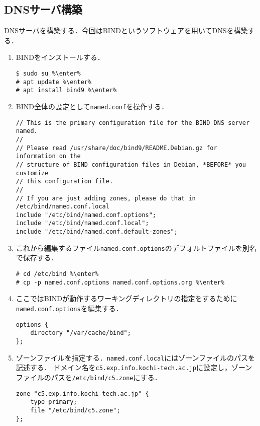 \subsection{DNSサーバ構築}
DNSサーバを構築する．今回はBINDというソフトウェアを用いてDNSを構築する．
\newcommand{\enter}{\ovalbox{Enter⏎}}
\begin{enumerate}
    \item BINDをインストールする．
          \begin{lstlisting}
$ sudo su %\enter%
# apt update %\enter%
# apt install bind9 %\enter%
    \end{lstlisting}
    \item BIND全体の設定として\texttt{named.conf}を操作する．
          \begin{lstlisting}[caption={\ttfamily /etc/bind/named.conf},style=file]
// This is the primary configuration file for the BIND DNS server named.
//
// Please read /usr/share/doc/bind9/README.Debian.gz for information on the
// structure of BIND configuration files in Debian, *BEFORE* you customize
// this configuration file.
//
// If you are just adding zones, please do that in /etc/bind/named.conf.local
include "/etc/bind/named.conf.options";
include "/etc/bind/named.conf.local";
include "/etc/bind/named.conf.default-zones";
\end{lstlisting}
    \item これから編集するファイル\texttt{named.conf.options}のデフォルトファイルを別名で保存する．
          \begin{lstlisting}
# cd /etc/bind %\enter%
# cp -p named.conf.options named.conf.options.org %\enter%
\end{lstlisting}
    \item ここではBINDが動作するワーキングディレクトリの指定をするために\texttt{named.conf.options}を編集する．
          \begin{lstlisting}[caption={\ttfamily /etc/bind/named.conf.options},style=file]
options {
    directory "/var/cache/bind";
};
\end{lstlisting}
    \item ゾーンファイルを指定する．\texttt{named.conf.local}にはゾーンファイルのパスを記述する．
          ドメイン名を\texttt{c5.exp.info.kochi-tech.ac.jp}に設定し，ゾーンファイルのパスを\texttt{/etc/bind/c5.zone}にする．
          \begin{lstlisting}[style=file,caption={\ttfamily /etc/bind/named.conf.local}]
zone "c5.exp.info.kochi-tech.ac.jp" {
    type primary;
    file "/etc/bind/c5.zone";
};
    \end{lstlisting}

\end{enumerate}
